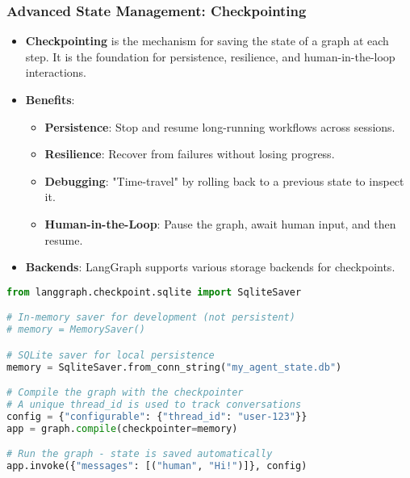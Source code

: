 \begin{frame}[fragile]\frametitle{Advanced State Management: Checkpointing}
      \begin{itemize}
        \item \textbf{Checkpointing} is the mechanism for saving the state of a graph at each step. It is the foundation for persistence, resilience, and human-in-the-loop interactions.
        \item \textbf{Benefits}:
        \begin{itemize}
            \item \textbf{Persistence}: Stop and resume long-running workflows across sessions.
            \item \textbf{Resilience}: Recover from failures without losing progress.
            \item \textbf{Debugging}: "Time-travel" by rolling back to a previous state to inspect it.
            \item \textbf{Human-in-the-Loop}: Pause the graph, await human input, and then resume.
        \end{itemize}
        \item \textbf{Backends}: LangGraph supports various storage backends for checkpoints.
      \end{itemize}
\begin{lstlisting}[language=Python, basicstyle=\tiny]
from langgraph.checkpoint.sqlite import SqliteSaver

# In-memory saver for development (not persistent)
# memory = MemorySaver()

# SQLite saver for local persistence
memory = SqliteSaver.from_conn_string("my_agent_state.db")

# Compile the graph with the checkpointer
# A unique thread_id is used to track conversations
config = {"configurable": {"thread_id": "user-123"}}
app = graph.compile(checkpointer=memory)

# Run the graph - state is saved automatically
app.invoke({"messages": [("human", "Hi!")]}, config)
\end{lstlisting}
\end{frame}

